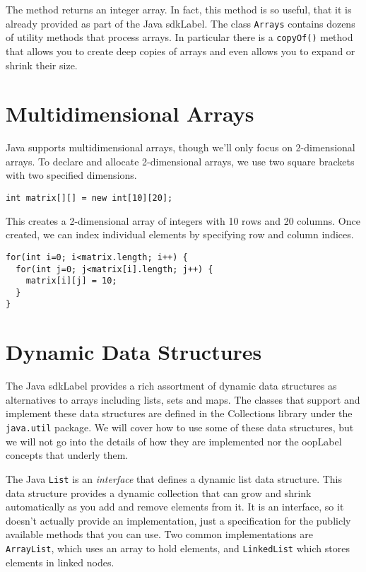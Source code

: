 The method returns an integer array.  In fact, this method is
so useful, that it is already provided as part of the Java \gls{sdkLabel}.
The class \texttt{Arrays} contains dozens of utility
methods that process arrays.  In particular there is a \texttt{copyOf()}
method that allows you to create deep copies of arrays and
even allows you to expand or shrink their size.

\section{Multidimensional Arrays}

Java supports multidimensional arrays, though we'll only focus 
on 2-dimensional arrays.  To declare and allocate 2-dimensional
arrays, we use two square brackets with two specified
dimensions.

\begin{verbatim}
int matrix[][] = new int[10][20];
\end{verbatim}

This creates a 2-dimensional array of integers with 10 rows and
20 columns.  Once created, we can index individual elements by
specifying row and column indices.

\begin{verbatim}
for(int i=0; i<matrix.length; i++) {
  for(int j=0; j<matrix[i].length; j++) {
    matrix[i][j] = 10;
  }
}
\end{verbatim}

\section{Dynamic Data Structures}

The Java \gls{sdkLabel} provides a rich assortment of dynamic
data structures as alternatives to arrays including lists, sets and
maps.  The classes that support and implement these data 
structures are defined in the Collections library under the 
\texttt{java.util} package.  We will cover how to use
some of these data structures, but we will not go into the
details of how they are implemented nor the \gls{oopLabel}
concepts that underly them.

The Java  \texttt{List} is 
an \emph{interface} that
defines a dynamic list data structure.  This data structure
provides a dynamic collection that can grow and shrink 
automatically as you add and remove elements from it.  It
is an interface, so it doesn't actually provide an implementation, 
just a specification for the publicly available methods that
you can use.  Two common implementations are 
\texttt{ArrayList}, which uses an array to hold 
elements, and \texttt{LinkedList} which stores
elements in linked nodes.

